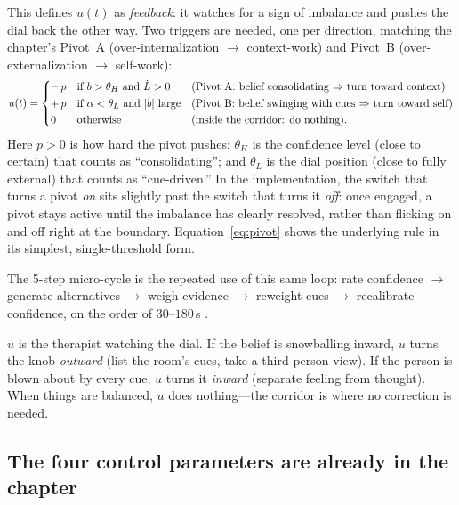 \documentclass[11pt]{article}
\begin{document}
\noindent This defines $u(t)$ as \emph{feedback}: it watches for a sign of imbalance and pushes the dial back the other way. Two triggers are needed, one per direction, matching the chapter's Pivot~A (over-internalization $\rightarrow$ context-work) and Pivot~B (over-externalization $\rightarrow$ self-work):
\begin{equation}
u(t)=\left\{
\begin{array}{@{}l@{\quad}l@{\quad}l@{}}
-\,p & \text{if } b>\theta_H \text{ and } \dot L>0 & \text{(Pivot A: belief consolidating $\Rightarrow$ turn toward context)}\\[3pt]
+\,p & \text{if } \alpha<\theta_L \text{ and } |\dot b|\text{ large} & \text{(Pivot B: belief swinging with cues $\Rightarrow$ turn toward self)}\\[3pt]
0 & \text{otherwise} & \text{(inside the corridor: do nothing).}
\end{array}\right.
\label{eq:pivot}
\end{equation}
Here $p>0$ is how hard the pivot pushes; $\theta_H$ is the confidence level (close to certain) that counts as ``consolidating''; and $\theta_L$ is the dial position (close to fully external) that counts as ``cue-driven.'' In the implementation, the switch that turns a pivot \emph{on} sits slightly past the switch that turns it \emph{off}: once engaged, a pivot stays active until the imbalance has clearly resolved, rather than flicking on and off right at the boundary. Equation~\eqref{eq:pivot} shows the underlying rule in its simplest, single-threshold form.

The 5-step micro-cycle \citep[footnote~2, p.~6]{HanEtAL2025} is the repeated use of this same loop: rate confidence $\to$ generate alternatives $\to$ weigh evidence $\to$ reweight cues $\to$ recalibrate confidence, on the order of $30$--$180$\,s \citep[p.~9]{HanEtAL2025}.

\begin{plainbox}
$u$ is the therapist watching the dial. If the belief is snowballing inward, $u$ turns the knob \emph{outward} (list the room's cues, take a third-person view). If the person is blown about by every cue, $u$ turns it \emph{inward} (separate feeling from thought). When things are balanced, $u$ does nothing---the corridor is where no correction is needed.
\end{plainbox}

\subsection{The four control parameters are already in the chapter}
\end{document}
